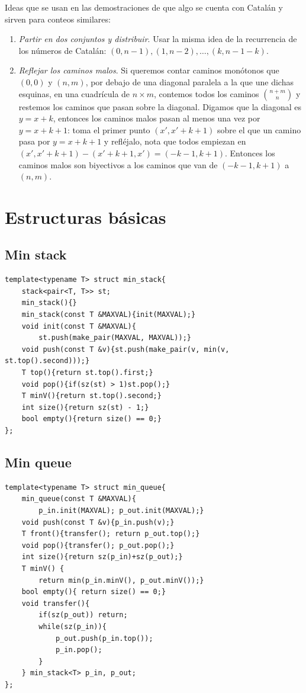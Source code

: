 \documentclass[10pt,spanish,mexico]{article}
\numberwithin{equation}{section}
\begin{document}
\begin{multicols}{2}
Ideas que se usan en las demostraciones de que algo se cuenta con Catalán y sirven para conteos similares:
\begin{enumerate}[1.]
    \item \textit{Partir en dos conjuntos y distribuir}. Usar la misma idea de la recurrencia de los números de Catalán: $(0, n - 1), (1, n - 2), \dots, (k, n - 1 - k)$.
    \item \textit{Reflejar los caminos malos}. Si queremos contar caminos monótonos que $(0, 0)$ y $(n, m)$, por debajo de una diagonal paralela a la que une dichas esquinas, en una cuadrícula de $n \times m$, contemos todos los caminos $\binom{n + m}{n}$ y restemos los caminos que pasan sobre la diagonal. Digamos que la diagonal es $y = x + k$, entonces los caminos malos pasan al menos una vez por $y = x + k + 1$: toma el primer punto $(x', x' + k + 1)$ sobre el que un camino pasa por $y = x + k + 1$ y refléjalo, nota que todos empiezan en $(x', x' + k + 1) - (x' + k + 1, x') = (- k - 1, k + 1)$. Entonces los caminos malos son biyectivos a los caminos que van de $(- k - 1, k + 1)$ a $(n, m)$.
\end{enumerate}

\hrulefill
\section{Estructuras básicas}
\subsection{Min stack}
\begin{verbatim}
template<typename T> struct min_stack{
    stack<pair<T, T>> st;
    min_stack(){}
    min_stack(const T &MAXVAL){init(MAXVAL);}
    void init(const T &MAXVAL){
        st.push(make_pair(MAXVAL, MAXVAL));}
    void push(const T &v){st.push(make_pair(v, min(v, st.top().second)));}
    T top(){return st.top().first;}
    void pop(){if(sz(st) > 1)st.pop();}
    T minV(){return st.top().second;}
    int size(){return sz(st) - 1;}
    bool empty(){return size() == 0;}
};
\end{verbatim}

\vspace{-1.2\baselineskip}
\hrulefill
\subsection{Min queue}
\begin{verbatim}
template<typename T> struct min_queue{
    min_queue(const T &MAXVAL){
        p_in.init(MAXVAL); p_out.init(MAXVAL);}
    void push(const T &v){p_in.push(v);}
    T front(){transfer(); return p_out.top();}
    void pop(){transfer(); p_out.pop();}
    int size(){return sz(p_in)+sz(p_out);}
    T minV() {
        return min(p_in.minV(), p_out.minV());}
    bool empty(){ return size() == 0;}
    void transfer(){
        if(sz(p_out)) return;
        while(sz(p_in)){
            p_out.push(p_in.top());
            p_in.pop();
        }
    } min_stack<T> p_in, p_out;
};
\end{verbatim}


\end{multicols}
\end{document}
